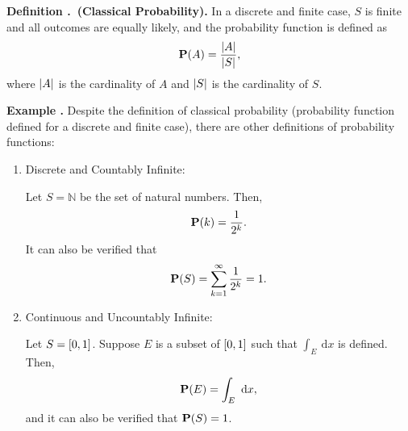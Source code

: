 \documentclass[12pt, a4paper]{article}
\newcounter{index}[subsection]
\newenvironment*{df}[1]{\par\noindent\textbf{Definition \thesubsection.\stepcounter{index}\theindex\ (#1).}}{\par}
\newenvironment*{eg}{\begin{framed}\par\noindent\textbf{Example \thesubsection.\stepcounter{index}\theindex}}{\par\end{framed}}
\def\N{\mathbb{N}}
\def\d{\mathrm{d}}
\def\dsst{\displaystyle}
\def\P{\vb{P}}
\begin{document}
\begin{df}{Classical Probability}
	In a discrete and finite case, $S$ is finite and all outcomes are equally likely, and the probability function is defined as \[\P(A)=\dfrac{\qty|A|}{\qty|S|},\] where $\qty|A|$ is the cardinality of $A$ and $\qty|S|$ is the cardinality of $S$.	
\end{df}
\begin{eg}
	Despite the definition of classical probability (probability function defined for a discrete and finite case), there are other definitions of probability functions: 
	\begin{enumerate}
		\item Discrete and Countably Infinite: \par Let $S=\N$ be the set of natural numbers. Then, \[\P(k)=\dfrac{1}{2^k}.\] It can also be verified that \[\P(S)=\sum_{k=1}^\infty\dfrac{1}{2^k}=1.\]
		\item Continuous and Uncountably Infinite: \par Let $S=\qty[0,1]$. Suppose $E$ is a subset of $\qty[0,1]$ such that $\dsst\int_E\ \d x$ is defined. Then, \[\P(E)=\int_E\ \d x,\] and it can also be verified that $\P(S)=1$.
	\end{enumerate}	
\end{eg}

\newpage
\end{document}
